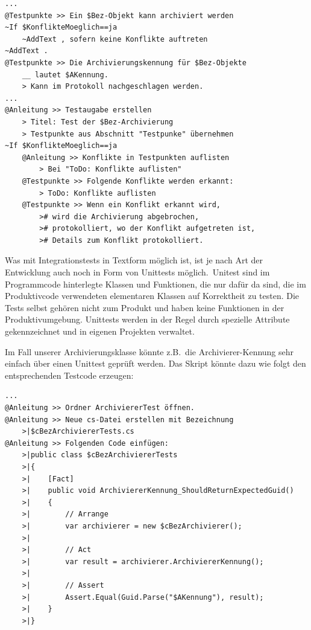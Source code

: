 \label{BspArchivklasse3}
\begin{verbatim}
...
@Testpunkte >> Ein $Bez-Objekt kann archiviert werden
~If $KonflikteMoeglich==ja
    ~AddText , sofern keine Konflikte auftreten
~AddText .
@Testpunkte >> Die Archivierungskennung für $Bez-Objekte 
    __ lautet $AKennung.
    > Kann im Protokoll nachgeschlagen werden.
...
@Anleitung >> Testaugabe erstellen
    > Titel: Test der $Bez-Archivierung
    > Testpunkte aus Abschnitt "Testpunke" übernehmen
~If $KonflikteMoeglich==ja
    @Anleitung >> Konflikte in Testpunkten auflisten
        > Bei "ToDo: Konflikte auflisten"
    @Testpunkte >> Folgende Konflikte werden erkannt:
        > ToDo: Konflikte auflisten
    @Testpunkte >> Wenn ein Konflikt erkannt wird,
        ># wird die Archivierung abgebrochen,
        ># protokolliert, wo der Konflikt aufgetreten ist,
        ># Details zum Konflikt protokolliert.
\end{verbatim}

Was mit Integrationstests in Textform möglich ist, ist je nach Art der Entwicklung auch noch in Form von Unittests möglich. Unitest sind im Programmcode hinterlegte Klassen und Funktionen, die nur dafür da sind, die im Produktivcode verwendeten elementaren Klassen auf Korrektheit zu testen. Die Tests selbst gehören nicht zum Produkt und haben keine Funktionen in der Produktivumgebung. Unittests werden in der Regel durch spezielle Attribute gekennzeichnet und in eigenen Projekten verwaltet.

Im Fall unserer Archivierungsklasse könnte z.B.\ die Archivierer-Kennung sehr einfach über einen Unittest geprüft werden. Das Skript könnte dazu wie folgt den entsprechenden Testcode erzeugen:

\label{BspArchivklasse4}
\begin{verbatim}
...
@Anleitung >> Ordner ArchiviererTest öffnen.
@Anleitung >> Neue cs-Datei erstellen mit Bezeichnung
    >|$cBezArchiviererTests.cs
@Anleitung >> Folgenden Code einfügen:
    >|public class $cBezArchiviererTests
    >|{
    >|    [Fact]
    >|    public void ArchiviererKennung_ShouldReturnExpectedGuid()
    >|    {
    >|        // Arrange
    >|        var archivierer = new $cBezArchivierer();
    >|
    >|        // Act
    >|        var result = archivierer.ArchiviererKennung();
    >|
    >|        // Assert
    >|        Assert.Equal(Guid.Parse("$AKennung"), result);
    >|    }
    >|}
\end{verbatim}

